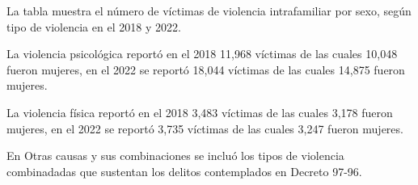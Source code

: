 La tabla muestra el número de víctimas de violencia intrafamiliar por sexo, según tipo de violencia en el 2018 y 2022. 

La violencia psicológica reportó en el 2018 11,968 víctimas de las cuales 10,048 fueron mujeres, en el 2022 se reportó 18,044 víctimas de las cuales 14,875 fueron mujeres. 

La violencia física reportó en el 2018 3,483 víctimas de las cuales 3,178 fueron mujeres, en el 2022 se reportó 3,735 víctimas de las cuales 3,247 fueron mujeres. 

En Otras causas y sus combinaciones se incluó los tipos de violencia combinadadas que sustentan los delitos contemplados en Decreto 97-96.